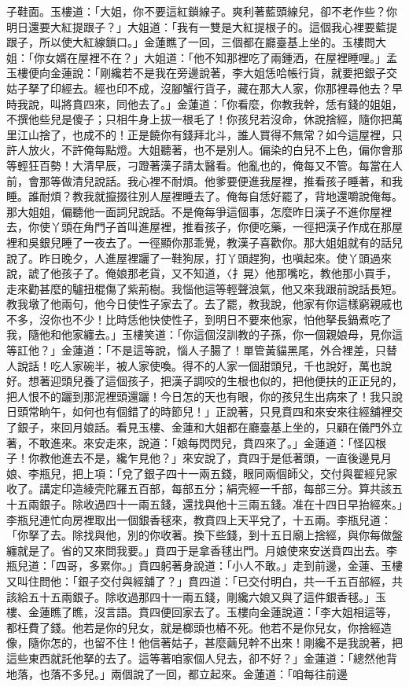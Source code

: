 子鞋面。玉樓道：「大姐，你不要這紅鎖線子。爽利著藍頭線兒，卻不老作些？你明日還要大紅提跟子？」大姐道：「我有一雙是大紅提根子的。這個我心裡要藍提跟子，所以使大紅線鎖口。」金蓮瞧了一回，三個都在廳臺基上坐的。玉樓問大姐：「你女婿在屋裡不在？」大姐道：「他不知那裡吃了兩鍾洒，在屋裡睡哩。」孟玉樓便向金蓮說：「剛纔若不是我在旁邊說著，李大姐恁哈帳行貨，就要把銀子交姑子拏了印經去。經也印不成，沒腳蟹行貨子，藏在那大人家，你那裡尋他去？早時我說，叫將賁四來，同他去了。」金蓮道：「你看麼，你教我幹，恁有錢的姐姐，不撰他些兒是傻子；只相牛身上拔一根毛了！你孩兒若沒命，休說捨經，隨你把萬里江山捨了，也成不的！正是饒你有錢拜北斗，誰人買得不無常？如今這屋裡，只許人放火，不許俺每點燈。大姐聽著，也不是別人。偏染的白兒不上色，偏你會那等輕狂百勢！大清早辰，刁蹬著漢子請太醫看。他亂也的，俺每又不管。每當在人前，會那等做清兒說話。我心裡不耐煩。他爹要便進我屋裡，推看孩子睡著，和我睡。誰耐煩？教我就攛掇往別人屋裡睡去了。俺每自恁好罷了，背地還嚼說俺每。那大姐姐，偏聽他一面詞兒說話。不是俺每爭這個事，怎麼昨日漢子不進你屋裡去，你使丫頭在角門子首叫進屋裡，推看孩子，你便吃藥，一徑把漢子作成在那屋裡和吳銀兒睡了一夜去了。一徑顯你那乖覺，教漢子喜歡你。那大姐姐就有的話兒說了。昨日晚夕，人進屋裡躧了一鞋狗尿，打丫頭趕狗，也嗔起來。使丫頭過來說，諕了他孩子了。俺娘那老貨，又不知道，〈扌晃〉他那嘴吃，教他那小買手，走來勸甚麼的驢扭棍傷了紫荊樹。我惱他這等輕聲浪氣，他又來我跟前說話長短。教我墩了他兩句，他今日使性子家去了。去了罷，教我說，他家有你這樣窮親戚也不多，沒你也不少！比時恁他快使性子，到明日不要來他家，怕他拏長鍋煮吃了我，隨他和他家纏去。」玉樓笑道：「你這個沒訓教的子孫，你一個親娘母，見你這等訌他？」金蓮道：「不是這等說，惱人子腸了！單管黃貓黑尾，外合裡差，只替人說話！吃人家碗半，被人家使喚。得不的人家一個甜頭兒，千也說好，萬也說好。想著迎頭兒養了這個孩子，把漢子調咬的生根也似的，把他便扶的正正兒的，把人恨不的躧到那泥裡頭還躧！今日怎的天也有眼，你的孩兒生出病來了！我只說日頭常晌午，如何也有個錯了的時節兒！」正說著，只見賁四和來安來往經舖裡交了銀子，來回月娘話。看見玉樓、金蓮和大姐都在廳臺基上坐的，只顧在儀門外立著，不敢進來。來安走來，說道：「娘每閃閃兒，賁四來了。」金蓮道：「怪囚根子！你教他進去不是，纔乍見他？」來安說了，賁四于是低著頭，一直後邊見月娘、李瓶兒，把上項：「兌了銀子四十一兩五錢，眼同兩個師父，交付與翟經兒家收了。講定印造綾壳陀羅五百部，每部五分；絹壳經一千部，每部三分。算共該五十五兩銀子。除收過四十一兩五錢，還找與他十三兩五錢。准在十四日早抬經來。」李瓶兒連忙向房裡取出一個銀香毬來，教賁四上天平兌了，十五兩。李瓶兒道：「你拏了去。除找與他，別的你收著。換下些錢，到十五日廟上捨經，與你每做盤纏就是了。省的又來問我要。」賁四于是拿香毬出門。月娘使來安送賁四出去。李瓶兒道：「四哥，多累你。」賁四躬著身說道：「小人不敢。」走到前邊，金蓮、玉樓又叫住問他：「銀子交付與經舖了？」賁四道：「已交付明白，共一千五百部經，共該給五十五兩銀子。除收過那四十一兩五錢，剛纔六娘又與了這件銀香毬。」玉樓、金蓮瞧了瞧，沒言語。賁四便回家去了。玉樓向金蓮說道：「李大姐相這等，都枉費了錢。他若是你的兒女，就是榔頭也樁不死。他若不是你兒女，你捨經造像，隨你怎的，也留不住！他信著姑子，甚麼繭兒幹不出來！剛纔不是我說著，把這些東西就託他拏的去了。這等著咱家個人兒去，卻不好？」金蓮道：「總然他背地落，也落不多兒。」兩個說了一回，都立起來。金蓮道：「咱每往前邊